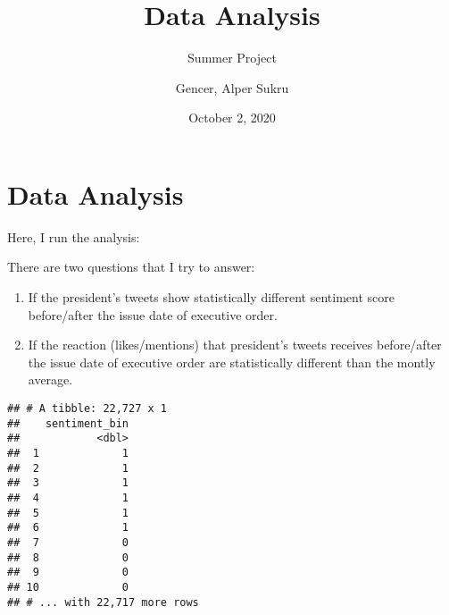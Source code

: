 \documentclass[
]{article}
\title{Data Analysis}
\subtitle{Summer Project}
\author{Gencer, Alper Sukru}
\date{October 2, 2020}
\newenvironment{Shaded}{\begin{snugshade}}{\end{snugshade}}
\newcommand{\CommentTok}[1]{\textcolor[rgb]{0.56,0.35,0.01}{\textit{#1}}}
\newcommand{\DataTypeTok}[1]{\textcolor[rgb]{0.13,0.29,0.53}{#1}}
\newcommand{\DecValTok}[1]{\textcolor[rgb]{0.00,0.00,0.81}{#1}}
\newcommand{\KeywordTok}[1]{\textcolor[rgb]{0.13,0.29,0.53}{\textbf{#1}}}
\newcommand{\NormalTok}[1]{#1}
\newcommand{\OperatorTok}[1]{\textcolor[rgb]{0.81,0.36,0.00}{\textbf{#1}}}
\newcommand{\StringTok}[1]{\textcolor[rgb]{0.31,0.60,0.02}{#1}}
\begin{document}
\maketitle

\bigskip

\hypertarget{data-analysis}{%
\section{Data Analysis}\label{data-analysis}}

Here, I run the analysis:

There are two questions that I try to answer:

\begin{enumerate}
  \item If the president's tweets show statistically different sentiment score before/after the issue date of executive order.
  \item If the reaction (likes/mentions) that president's tweets receives before/after the issue date of executive order are statistically different than the montly average. 
\end{enumerate}

\begin{Shaded}
\end{Shaded}

\begin{verbatim}
## # A tibble: 22,727 x 1
##    sentiment_bin
##            <dbl>
##  1             1
##  2             1
##  3             1
##  4             1
##  5             1
##  6             1
##  7             0
##  8             0
##  9             0
## 10             0
## # ... with 22,717 more rows
\end{verbatim}
\end{document}
